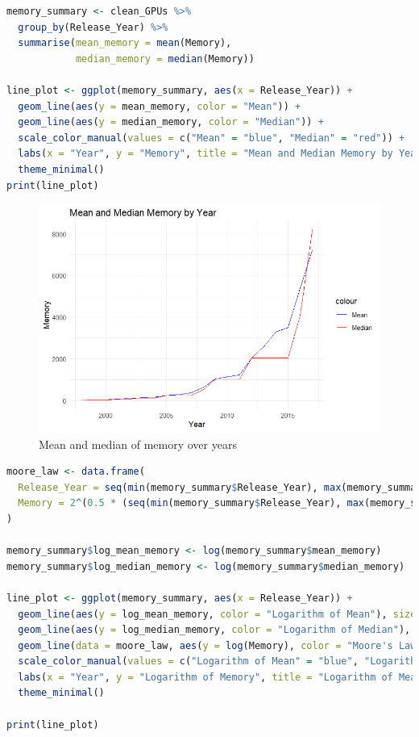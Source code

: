 \begin{lstlisting}[language=R]
memory_summary <- clean_GPUs %>%
  group_by(Release_Year) %>%
  summarise(mean_memory = mean(Memory),
            median_memory = median(Memory))

line_plot <- ggplot(memory_summary, aes(x = Release_Year)) +
  geom_line(aes(y = mean_memory, color = "Mean")) +
  geom_line(aes(y = median_memory, color = "Median")) +
  scale_color_manual(values = c("Mean" = "blue", "Median" = "red")) +
  labs(x = "Year", y = "Memory", title = "Mean and Median Memory by Year") +
  theme_minimal()
print(line_plot)
\end{lstlisting}

\begin{figure}[ht]
  \centering
  \includegraphics[width=1\linewidth]{img/MeaMedMem_Year.png}
  \vspace{1pt}
  \caption{Mean and median of memory over years}
\end{figure}

\begin{lstlisting}[language=R]
moore_law <- data.frame(
  Release_Year = seq(min(memory_summary$Release_Year), max(memory_summary$Release_Year), 1),
  Memory = 2^(0.5 * (seq(min(memory_summary$Release_Year), max(memory_summary$Release_Year), 1) - min(memory_summary$Release_Year - 8)))
)

memory_summary$log_mean_memory <- log(memory_summary$mean_memory)
memory_summary$log_median_memory <- log(memory_summary$median_memory)

line_plot <- ggplot(memory_summary, aes(x = Release_Year)) +
  geom_line(aes(y = log_mean_memory, color = "Logarithm of Mean"), size = 1) +
  geom_line(aes(y = log_median_memory, color = "Logarithm of Median"), size = 1) +
  geom_line(data = moore_law, aes(y = log(Memory), color = "Moore's Law"), size = 1, linetype = "dashed") +
  scale_color_manual(values = c("Logarithm of Mean" = "blue", "Logarithm of Median" = "red", "Moore's Law" = "green4")) +
  labs(x = "Year", y = "Logarithm of Memory", title = "Logarithm of Mean and Median Memory by Year") +
  theme_minimal()

print(line_plot)
\end{lstlisting}

